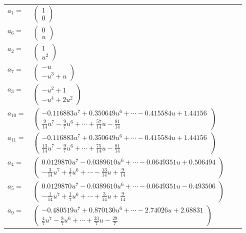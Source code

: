 \documentclass[1p]{elsarticle_modified}
\theoremstyle{definition}
\begin{document}
\begin{tabular}{m{7pt} m{180pt} m{7pt} m{180pt} }
\flushright $a_{1}=$&$\begin{pmatrix}1\\0\end{pmatrix}$ \\
\flushright $a_{6}=$&$\begin{pmatrix}0\\u\end{pmatrix}$ \\
\flushright $a_{2}=$&$\begin{pmatrix}1\\u^2\end{pmatrix}$ \\
\flushright $a_{7}=$&$\begin{pmatrix}- u\\- u^3+u\end{pmatrix}$ \\
\flushright $a_{3}=$&$\begin{pmatrix}- u^2+1\\- u^4+2 u^2\end{pmatrix}$ \\
\flushright $a_{10}=$&$\begin{pmatrix}-0.116883 u^{7}+0.350649 u^{6}+\cdots-0.415584 u+1.44156\\\frac{9}{14} u^7-\frac{9}{7} u^6+\cdots+\frac{57}{14} u-\frac{81}{14}\end{pmatrix}$ \\
\flushright $a_{11}=$&$\begin{pmatrix}-0.116883 u^{7}+0.350649 u^{6}+\cdots-0.415584 u+1.44156\\\frac{13}{14} u^7-\frac{9}{7} u^6+\cdots+\frac{75}{14} u-\frac{81}{14}\end{pmatrix}$ \\
\flushright $a_{4}=$&$\begin{pmatrix}0.0129870 u^{7}-0.0389610 u^{6}+\cdots-0.0649351 u+0.506494\\-\frac{3}{14} u^7+\frac{1}{7} u^6+\cdots-\frac{13}{14} u+\frac{9}{14}\end{pmatrix}$ \\
\flushright $a_{5}=$&$\begin{pmatrix}0.0129870 u^{7}-0.0389610 u^{6}+\cdots-0.0649351 u-0.493506\\-\frac{1}{14} u^7+\frac{1}{7} u^6+\cdots+\frac{3}{14} u+\frac{9}{14}\end{pmatrix}$ \\
\flushright $a_{9}=$&$\begin{pmatrix}-0.480519 u^{7}+0.870130 u^{6}+\cdots-2.74026 u+2.68831\\\frac{4}{7} u^7-\frac{8}{7} u^6+\cdots+\frac{23}{7} u-\frac{29}{7}\end{pmatrix}$ \\

\end{tabular}
\end{document}

